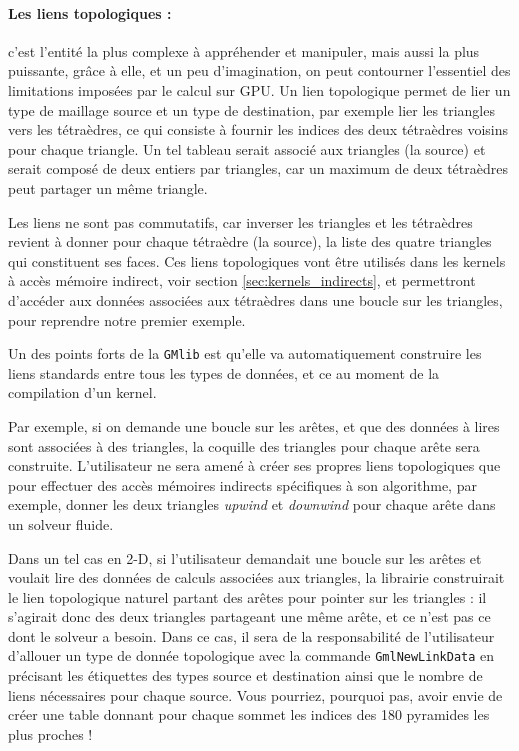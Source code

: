 \documentclass[a4paper,12pt]{article}
\begin{document}
\paragraph{Les liens topologiques : } c'est l'entité la plus complexe à appréhender et manipuler, mais aussi la plus puissante, grâce à elle, et un peu d'imagination, on peut contourner l'essentiel des limitations imposées par le calcul sur GPU.
Un lien topologique permet de lier un type de maillage source et un type de destination, par exemple lier les triangles vers les tétraèdres, ce qui consiste à fournir les indices des deux tétraèdres voisins pour chaque triangle.
Un tel tableau serait associé aux triangles (la source) et serait composé de deux entiers par triangles, car un maximum de deux tétraèdres peut partager un même triangle.

Les liens ne sont pas commutatifs, car inverser les triangles et les tétraèdres revient à donner pour chaque tétraèdre (la source), la liste des quatre triangles qui constituent ses faces.
Ces liens topologiques vont être utilisés dans les kernels à accès mémoire indirect, voir section \ref{sec:kernels_indirects}, et permettront d'accéder aux données associées aux tétraèdres dans une boucle sur les triangles, pour reprendre notre premier exemple.

Un des points forts de la {\tt GMlib} est qu'elle va automatiquement construire les liens standards entre tous les types de données, et ce au moment de la compilation d'un kernel.

Par exemple, si on demande une boucle sur les arêtes, et que des données à lires sont associées à des triangles, la coquille des triangles pour chaque arête sera construite.
L'utilisateur ne sera amené à créer ses propres liens topologiques que pour effectuer des accès mémoires indirects spécifiques à son algorithme, par exemple, donner les deux triangles \emph{upwind} et \emph{downwind} pour chaque arête dans un solveur fluide.

Dans un tel cas en 2-D, si l'utilisateur demandait une boucle sur les arêtes et voulait lire des données de calculs associées aux triangles, la librairie construirait le lien topologique naturel partant des arêtes pour pointer sur les triangles : il s'agirait donc des deux triangles partageant une même arête, et ce n'est pas ce dont le solveur a besoin.
Dans ce cas, il sera de la responsabilité de l'utilisateur d'allouer un type de donnée topologique avec la commande {\tt GmlNewLinkData} en précisant les étiquettes des types source et destination ainsi que le nombre de liens nécessaires pour chaque source.
Vous pourriez, pourquoi pas, avoir envie de créer une table donnant pour chaque sommet les indices des 180 pyramides les plus proches !
\end{document}
